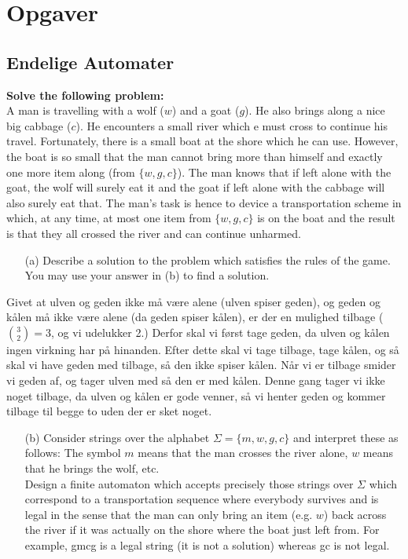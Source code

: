 \chapter{Opgaver}

\section{Endelige Automater}

\noindent
\textbf{Solve the following problem:} \\
\noindent
A man is travelling with a wolf ($w$) and a goat ($g$). He also brings along a nice big cabbage ($c$). He encounters a small river which e must cross to continue his travel. Fortunately, there is a small boat at the shore which he can use. However, the boat is so small that the man cannot bring more than himself and exactly one more item along (from $\{w, g, c\}$). The man knows that if left alone with the goat, the wolf will surely eat it and the goat if left alone with the cabbage will also surely eat that. The man's task is hence to device a transportation scheme in which, at any time, at most one item from $\{w,g,c\}$ is on the boat and the result is that they all crossed the river and can continue unharmed.

\begin{enumerate}
	\item[(a)] Describe a solution to the problem which satisfies the rules of the game. You may use your answer in (b) to find a solution.
\end{enumerate}

Givet at ulven og geden ikke må være alene (ulven spiser geden), og geden og kålen må ikke være alene (da geden spiser kålen), er der en mulighed tilbage ($\binom{3}{2} = 3$, og vi udelukker 2.) Derfor skal vi først tage geden, da ulven og kålen ingen virkning har på hinanden. Efter dette skal vi tage tilbage, tage kålen, og så skal vi have geden med tilbage, så den ikke spiser kålen. Når vi er tilbage smider vi geden af, og tager ulven med så den er med kålen. Denne gang tager vi ikke noget tilbage, da ulven og kålen er gode venner, så vi henter geden og kommer tilbage til begge to uden der er sket noget.

\begin{enumerate}
	\item [(b)] Consider strings over the alphabet $\Sigma = \{m, w, g, c\}$ and interpret these as follows: The symbol $m$ means that the man crosses the river alone, $w$ means that he brings the wolf, etc. \\ Design a finite automaton which accepts precisely those strings over $\Sigma$ which correspond to a transportation sequence where everybody survives and is legal in the sense that the man can only bring an item (e.g. $w$) back across the river if it was actually on the shore where the boat just left from. For example, gmcg is a legal string (it is not a solution) whereas gc is not legal.
\end{enumerate}

